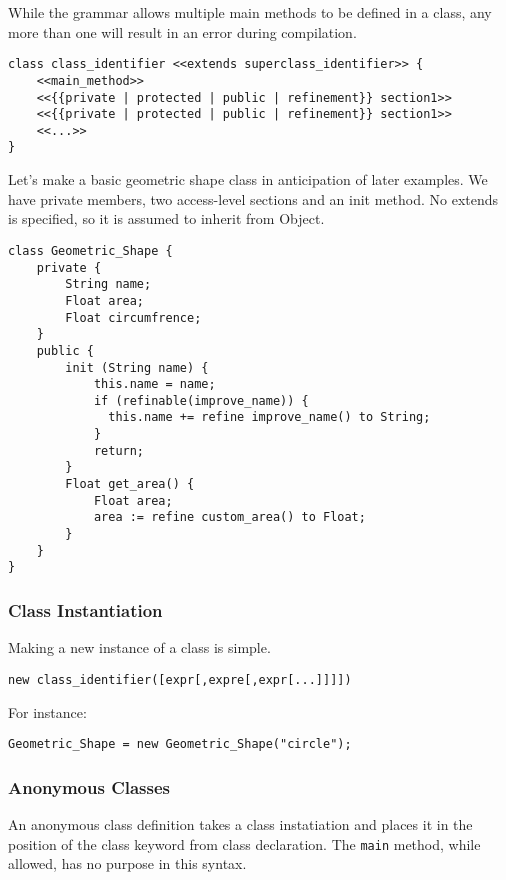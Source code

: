 While the grammar allows multiple main methods to be defined in a class, any more than one will result in an error during compilation.

\begin{lstlisting}
class class_identifier <<extends superclass_identifier>> {
    <<main_method>>
    <<{{private | protected | public | refinement}} section1>>
    <<{{private | protected | public | refinement}} section1>>
    <<...>>
}
\end{lstlisting}

Let's make a basic geometric shape class in anticipation of later examples. We have private members, two access-level sections and an init method. No extends is specified, so it is assumed to inherit from Object.


\begin{lstlisting}[label=Method Invocation,caption=Class Declaration for a Geometric Shape class]
class Geometric_Shape {
    private {
        String name;
        Float area;
        Float circumfrence;
    }
    public {
        init (String name) {
            this.name = name;
            if (refinable(improve_name)) {
              this.name += refine improve_name() to String;
            }
            return;
        }
        Float get_area() {
            Float area;
            area := refine custom_area() to Float;
        }
    }
}
\end{lstlisting}

\subsubsection{Class Instantiation}
Making a new instance of a class is simple.

\begin{lstlisting}
new class_identifier([expr[,expre[,expr[...]]]])
\end{lstlisting}

For instance:

\begin{lstlisting}[label=Method Invocation,caption=Class Instantiation for a Geometric Shape class]
Geometric_Shape = new Geometric_Shape("circle");
\end{lstlisting}

\subsubsection{Anonymous Classes}
An anonymous class definition takes a class instatiation and places it in the position of the class keyword from class declaration. The \verb!main! method, while allowed, has no purpose in this syntax.

